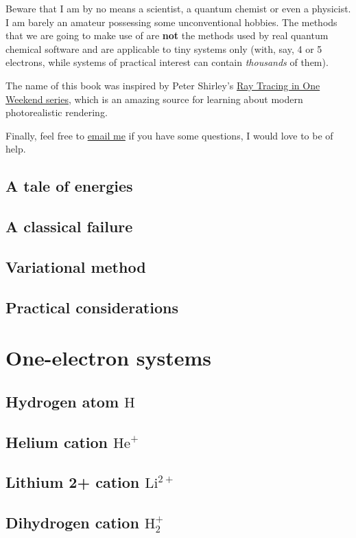 \documentclass{book}
\newcommand{\molecule}[1]{\textrm{#1}}
\begin{document}
Beware that I am by no means a scientist, a quantum chemist or even a physicist. I am barely an amateur possessing some unconventional hobbies. The methods that we are going to make use of are \textbf{not} the methods used by real quantum chemical software and are applicable to tiny systems only (with, say, 4 or 5 electrons, while systems of practical interest can contain \textit{thousands} of them).

The name of this book was inspired by Peter Shirley's \href{https://raytracing.github.io}{Ray Tracing in One Weekend series}, which is an amazing source for learning about modern photorealistic rendering.

Finally, feel free to \href{mailto:lisyarus@gmail.com}{email me} if you have some questions, I would love to be of help.

\section{A tale of energies}
\section{A classical failure}
\section{Variational method} \label{sec:var}
\section{Practical considerations}

\chapter{One-electron systems} \label{chap:one}
\section{Hydrogen atom \(\molecule{H}\)}
\section{Helium cation \(\molecule{He}^+\)} 
\section{Lithium 2+ cation \(\molecule{Li}^{2+}\)}
\section{Dihydrogen cation \(\molecule{H}_2^+\)}
\end{document}
